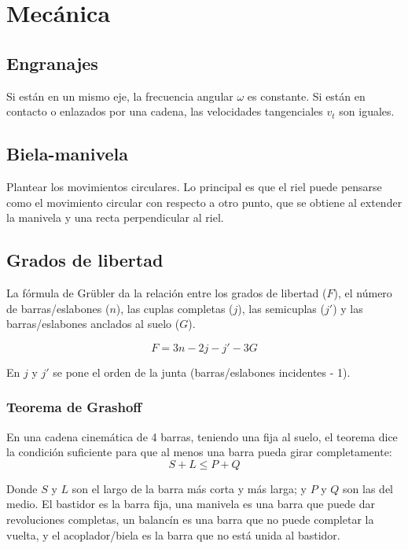 \section{Mecánica}

\subsection*{Engranajes}

Si están en un mismo eje, la frecuencia angular $\omega$ es constante. Si están en contacto o enlazados por una cadena, las velocidades tangenciales $v_t$ son iguales.


\subsection*{Biela-manivela}

Plantear los movimientos circulares. Lo principal es que el riel puede pensarse como el movimiento circular con respecto a otro punto, que se obtiene al extender la manivela y una recta perpendicular al riel.


\subsection*{Grados de libertad}

La fórmula de Grübler da la relación entre los grados de libertad ($F$), el número de barras/eslabones ($n$), las cuplas completas ($j$), las semicuplas ($j'$) y las barras/eslabones anclados al suelo ($G$).

$$F = 3n - 2j - j' - 3G$$

En $j$ y $j'$ se pone el orden de la junta (barras/eslabones incidentes - 1).

\subsubsection*{Teorema de Grashoff}

En una cadena cinemática de 4 barras, teniendo una fija al suelo, el teorema dice la condición suficiente para que al menos una barra pueda girar completamente:
$$
S + L \leq P + Q
$$

Donde $S$ y $L$ son el largo de la barra más corta y más larga; y $P$ y $Q$ son las del medio. El bastidor es la barra fija, una manivela es una barra que puede dar revoluciones completas, un balancín es una barra que no puede completar la vuelta, y el acoplador/biela es la barra que no está unida al bastidor.